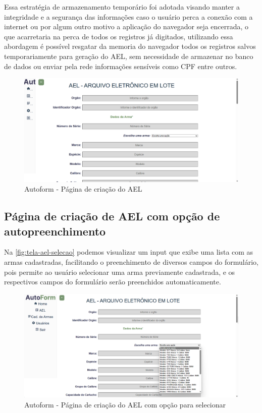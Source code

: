 Essa estratégia de armazenamento temporário foi adotada visando manter a integridade e a segurança das informações caso o usuário perca a conexão com a internet ou por algum outro motivo a aplicação do navegador seja encerrada, o que acarretaria na perca de todos os registros já digitados, utilizando essa abordagem é possível resgatar da memoria do navegador todos os registros salvos temporariamente para geração do AEL, sem necessidade de armazenar no banco de dados ou enviar pela rede informações sensíveis como CPF entre outros. 
\begin{figure}[htb]
    \caption{\label{fig:tela-ael1}Autoform - Página de criação do AEL}
    \begin{center}
        \includegraphics[scale=0.5]{imagens/autoform-ael-gerar.png}
    \end{center}
\end{figure}

\subsection{Página de criação de AEL com opção de autopreenchimento}
Na \autoref{fig:tela-ael-selecao} podemos visualizar um input que exibe uma lista com as armas cadastradas, facilitando o preenchimento de diversos campos do formulário,
pois permite ao usuário selecionar uma arma previamente cadastrada, e os respectivos campos do formulário serão preenchidos automaticamente.

\begin{figure}[H]
    \caption{\label{fig:tela-ael-selecao}Autoform - Página de criação do AEL com opção para selecionar}
    \begin{center}
        \includegraphics[scale=0.3]{imagens/autoform-ael-selecao.png}
    \end{center}
\end{figure}

